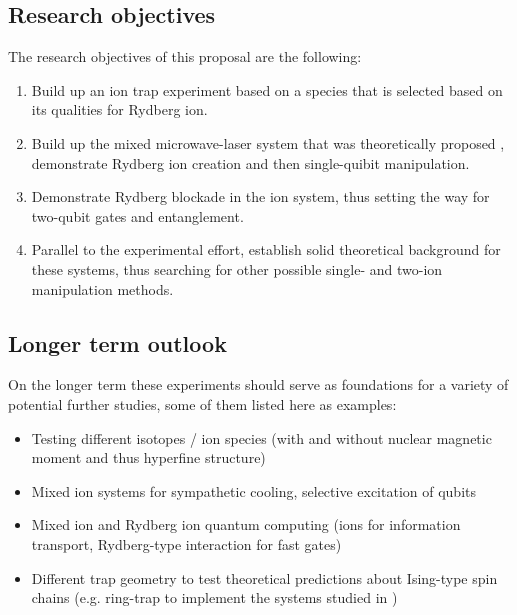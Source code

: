 \subsection{Research objectives}
The research objectives of this proposal are the following:
\begin{enumerate}
 \item Build up an ion trap experiment based on a species that is selected based on its qualities for Rydberg ion.
 \item Build up the mixed microwave-laser system that was theoretically proposed \cite{Mueller2008}, demonstrate Rydberg ion creation and then single-quibit manipulation.
 \item Demonstrate Rydberg blockade in the ion system, thus setting the way for two-qubit gates and entanglement.
 \item Parallel to the experimental effort, establish solid theoretical background for these systems, thus searching for other possible single- and two-ion manipulation methods.
\end{enumerate}


\subsection{Longer term outlook}
On the longer term these experiments should serve as foundations for a variety of potential further studies, some of them listed here as examples:
\begin{itemize}
 \item Testing different isotopes / ion species (with and without nuclear magnetic moment and thus hyperfine structure)
 \item Mixed ion systems for sympathetic cooling, selective excitation of qubits
 \item Mixed ion and Rydberg ion quantum computing (ions for information transport, Rydberg-type interaction for fast gates)
 \item Different trap geometry to test theoretical predictions about Ising-type spin chains (e.g. ring-trap \cite{Champenois2010} to implement the systems studied in \cite{Weimer2010})
\end{itemize}

